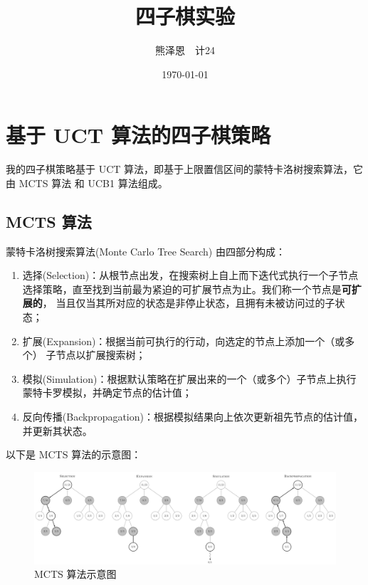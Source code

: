 \documentclass[UTF8]{ctexart}
\title{四子棋实验}
\author{熊泽恩~~计24}
\date{\today}
\begin{document}
\maketitle

\tableofcontents

\newpage

\section{基于 UCT 算法的四子棋策略}

我的四子棋策略基于 UCT 算法，即基于上限置信区间的蒙特卡洛树搜索算法，它由 MCTS 算法
和 UCB1 算法组成。

\subsection{MCTS 算法}

蒙特卡洛树搜索算法(Monte Carlo Tree Search) 由四部分构成：
\begin{enumerate}
    \item 选择(Selection)：从根节点出发，在搜索树上自上而下迭代式执行一个子节点
            选择策略，直至找到当前最为紧迫的可扩展节点为止。我们称一个节点是\textbf{可扩展的}，
            当且仅当其所对应的状态是非停止状态，且拥有未被访问过的子状态；
    \item 扩展(Expansion)：根据当前可执行的行动，向选定的节点上添加一个（或多个）
            子节点以扩展搜索树；
    \item 模拟(Simulation)：根据默认策略在扩展出来的一个（或多个）子节点上执行
            蒙特卡罗模拟，并确定节点的估计值；
    \item 反向传播(Backpropagation)：根据模拟结果向上依次更新祖先节点的估计值，
            并更新其状态。
\end{enumerate}

以下是 MCTS 算法的示意图：

\begin{figure}[H]
    \centering
    \includegraphics[width=\textwidth]{../assets/MCTS.png}
    \caption{MCTS 算法示意图 \cite{MCTS-steps}}
\end{figure}
\end{document}
